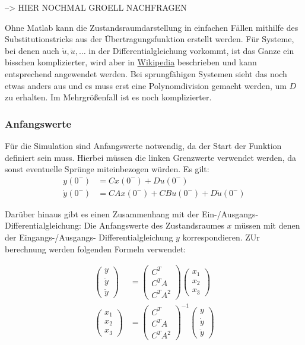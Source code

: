 --> HIER NOCHMAL GROELL NACHFRAGEN

Ohne Matlab kann die Zustandsraumdarstellung in einfachen Fällen mithilfe des Substitutionstricks aus der Übertragungsfunktion erstellt werden. Für Systeme, bei denen auch $\dot u, \ddot u, \ldots$ in der Differentialgleichung vorkommt, ist das Ganze ein bisschen komplizierter, wird aber in \href{https://de.wikipedia.org/wiki/Zustandsraumdarstellung#Regelungsnormalform}{Wikipedia} beschrieben und kann entsprechend angewendet werden. Bei sprungfähigen Systemen sieht das noch etwas anders aus und es muss erst eine Polynomdivision gemacht werden, um $D$ zu erhalten. Im Mehrgrößenfall ist es noch komplizierter.

\subsubsection*{Anfangswerte}

Für die Simulation sind Anfangswerte notwendig, da der Start der Funktion definiert sein muss. Hierbei müssen die linken Grenzwerte verwendet werden, da sonst eventuelle Sprünge miteinbezogen würden. Es gilt:
\begin{align*}
    y(0^-) & = Cx(0^-) + Du(0^-) \\
    \dot y(0^-) & = CAx(0^-) + CBu(0^-) + D \dot u (0^-)
\end{align*}

Darüber hinaus gibt es einen Zusammenhang mit der Ein-/Ausgangs-Differentialgleichung: Die Anfangswerte des Zustandsraumes $x$ müssen mit denen der Eingangs-/Ausgangs- Differentialgleichung $y$ korrespondieren. ZUr berechnung werden folgenden Formeln verwendet:

\begin{align*}
    \left(\begin{array}{c} y \\ \dot y \\ \ddot y \end{array}\right) &= \left(\begin{array}{l} C^T \\ C^T A \\ C^T A^2 \end{array}\right) \left(\begin{array}{c} x_1 \\ x_2 \\ x_3 \end{array}\right) \\
    \left(\begin{array}{c} x_1 \\ x_2 \\ x_3 \end{array}\right) &= \left(\begin{array}{l} C^T \\ C^T A \\ C^T A^2 \end{array}\right)^{-1} \left(\begin{array}{c} y \\ \dot y \\ \ddot y \end{array}\right)
\end{align*}

